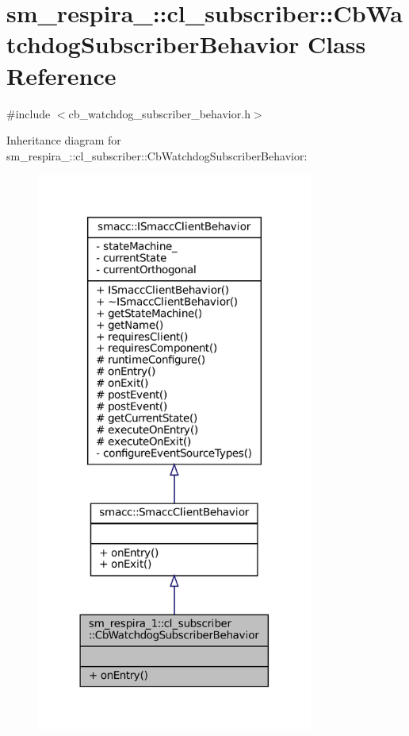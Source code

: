 \hypertarget{classsm__respira__1_1_1cl__subscriber_1_1CbWatchdogSubscriberBehavior}{}\section{sm\+\_\+respira\+\_\+:\+:cl\+\_\+subscriber\+:\+:Cb\+Watchdog\+Subscriber\+Behavior Class Reference}
\label{classsm__respira__1_1_1cl__subscriber_1_1CbWatchdogSubscriberBehavior}


{\ttfamily \#include $<$cb\+\_\+watchdog\+\_\+subscriber\+\_\+behavior.\+h$>$}



Inheritance diagram for sm\+\_\+respira\+\_\+:\+:cl\+\_\+subscriber\+:\+:Cb\+Watchdog\+Subscriber\+Behavior\+:
\nopagebreak
\begin{figure}[H]
\begin{center}
\leavevmode
\includegraphics[width=258pt]{classsm__respira__1_1_1cl__subscriber_1_1CbWatchdogSubscriberBehavior__inherit__graph}
\end{center}
\end{figure}


